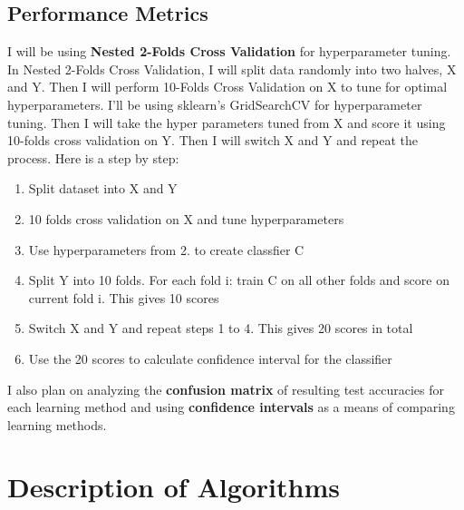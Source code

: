 \documentclass[12pt]{article}
\begin{document}
\subsection{Performance Metrics}
I will be using \textbf{Nested 2-Folds Cross Validation} for hyperparameter tuning. In Nested 2-Folds Cross Validation, I will split data randomly into two halves, X and Y. Then I will perform 10-Folds Cross Validation on X to tune for optimal hyperparameters. I'll be using sklearn's GridSearchCV for hyperparameter tuning. Then I will take the hyper parameters tuned from X and score it using 10-folds cross validation on Y. Then I will switch X and Y and repeat the process. Here is a step by step:
\begin{enumerate}
    \item Split dataset into X and Y
    \item 10 folds cross validation on X and tune hyperparameters
    \item Use hyperparameters from 2. to create classfier C
    \item Split Y into 10 folds. For each fold i: train C on all other folds and score on current fold i. This gives 10 scores
    \item Switch X and Y and repeat steps 1 to 4. This gives 20 scores in total
    \item Use the 20 scores to calculate confidence interval for the classifier
\end{enumerate}
I also plan on analyzing the \textbf{confusion matrix} of resulting test accuracies for each learning method and using \textbf{confidence intervals} as a means of comparing learning methods.

\section{Description of Algorithms}
\end{document}
